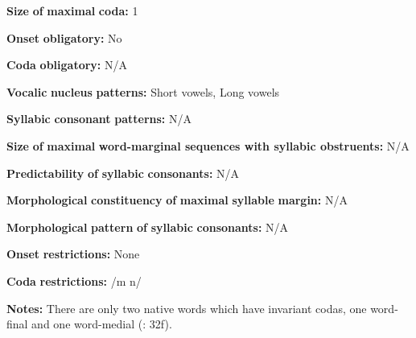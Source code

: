 \begin{styleBody}
\textbf{Size} \textbf{of} \textbf{maximal} \textbf{coda:} 1
\end{styleBody}

\begin{styleBody}
\textbf{Onset} \textbf{obligatory:} No
\end{styleBody}

\begin{styleBody}
\textbf{Coda} \textbf{obligatory:} N/A
\end{styleBody}

\begin{styleBody}
\textbf{Vocalic} \textbf{nucleus} \textbf{patterns:} Short vowels, Long vowels
\end{styleBody}

\begin{styleBody}
\textbf{Syllabic} \textbf{consonant} \textbf{patterns:} N/A
\end{styleBody}

\begin{styleBody}
\textbf{Size} \textbf{of} \textbf{maximal} \textbf{word{}-marginal sequences with syllabic obstruents:} N/A
\end{styleBody}

\begin{styleBody}
\textbf{Predictability} \textbf{of} \textbf{syllabic} \textbf{consonants:} N/A
\end{styleBody}

\begin{styleBody}
\textbf{Morphological} \textbf{constituency} \textbf{of} \textbf{maximal} \textbf{syllable} \textbf{margin:} N/A
\end{styleBody}

\begin{styleBody}
\textbf{Morphological} \textbf{pattern} \textbf{of} \textbf{syllabic} \textbf{consonants:} N/A
\end{styleBody}

\begin{styleBody}
\textbf{Onset} \textbf{restrictions:} None
\end{styleBody}

\begin{styleBody}
\textbf{Coda} \textbf{restrictions:} /m n/
\end{styleBody}

\begin{styleBody}
\textbf{Notes:} There are only two native words which have invariant codas, one word-final and one word-medial (\citealt{Pan2012}: 32f).
\end{styleBody}

